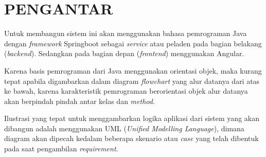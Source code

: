\chapter{PENGANTAR}

Untuk membangun sistem ini akan menggunakan bahasa pemrograman Java dengan \textit{framework} Springboot sebagai \textit{service} atau peladen pada bagian belakang (\textit{backend}). Sedangkan pada bagian depan (\textit{frontend}) menggunakan Angular.

Karena basis pemrograman dari Java menggunakan orientasi objek, maka kurang tepat apabila digambarkan dalam diagram \textit{flowchart} yang alur datanya dari atas ke bawah, karena karakteristik pemrograman berorientasi objek alur datanya akan berpindah pindah antar kelas dan \textit{method}.

Ilustrasi yang tepat untuk menggambarkan logika aplikasi dari sistem yang akan dibangun adalah menggunakan UML (\textit{Unified Modelling Language}), dimana diagram akan dipecah kedalam beberapa skenario atau \textit{case} yang telah dibentuk pada saat pengambilan \textit{requirement}.